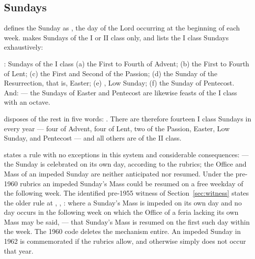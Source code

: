 \subsection{Sundays}

 defines the Sunday as , the day
of the Lord occurring at the beginning of each week.  makes Sundays of the I or II class
only, and  lists the I class Sundays exhaustively:

\begin{studybox}{: Sundays of the I class}
(a) the First to Fourth of Advent; (b) the First to Fourth of Lent; (c) the First and Second of
the Passion; (d) the Sunday of the Resurrection, that is, Easter; (e) ,
Low Sunday; (f) the Sunday of Pentecost. \\[0.3em]
And:  — the
Sundays of Easter and Pentecost are likewise feasts of the I class with an octave.
\end{studybox}

 disposes of the rest in five words: . There
are therefore fourteen I class Sundays in every year — four of Advent, four of Lent, two of the
Passion, Easter, Low Sunday, and Pentecost — and all others are of the II class.

 states a rule with no exceptions in this system and considerable consequences:
 — the Sunday is celebrated on its own day, according to the
rubrics; the Office and Mass of an impeded Sunday are neither anticipated nor resumed. Under
the pre-1960 rubrics an impeded Sunday's Mass could be resumed on a free weekday of the
following week. The identified pre-1955 witness of Section~\ref{sec:witness} states the older
rule at , ,
: where a Sunday's Mass is impeded on its own day  and no day
occurs in the following week on which the Office of a feria lacking its own Mass may be said,
 — that Sunday's Mass is
resumed on the first such day within the week. The 1960 code deletes the mechanism entire. An impeded Sunday in 1962 is commemorated if the
rubrics allow, and otherwise simply does not occur that year.

